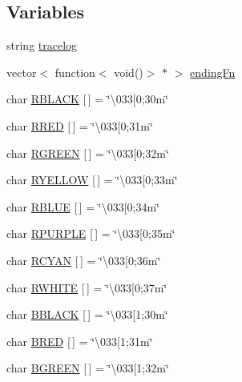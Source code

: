 \subsection*{Variables}
\begin{DoxyCompactItemize}
\item 
string \hyperlink{namespace_k_a8cf9916382d8c2046656233c4422022d}{tracelog}
\item 
vector$<$ function$<$ void()$>$ $\ast$ $>$ \hyperlink{namespace_k_a1c3ecbe3046298af183be61349de6900}{ending\+Fn}
\item 
char \hyperlink{namespace_k_a1203c8bea34ade1c1d524b0df5bfdf37}{R\+B\+L\+A\+CK} \mbox{[}$\,$\mbox{]} = \char`\"{}\textbackslash{}033\mbox{[}0;30m\char`\"{}
\item 
char \hyperlink{namespace_k_ae976a2e4e900318926db4fa1624bc30a}{R\+R\+ED} \mbox{[}$\,$\mbox{]} = \char`\"{}\textbackslash{}033\mbox{[}0;31m\char`\"{}
\item 
char \hyperlink{namespace_k_a9c4858b8b93beb509648e92071d727ca}{R\+G\+R\+E\+EN} \mbox{[}$\,$\mbox{]} = \char`\"{}\textbackslash{}033\mbox{[}0;32m\char`\"{}
\item 
char \hyperlink{namespace_k_abd378d9900fa5f1effc177ef1a3eaf88}{R\+Y\+E\+L\+L\+OW} \mbox{[}$\,$\mbox{]} = \char`\"{}\textbackslash{}033\mbox{[}0;33m\char`\"{}
\item 
char \hyperlink{namespace_k_a035ca76c4d8abd4253d53e1dfb952368}{R\+B\+L\+UE} \mbox{[}$\,$\mbox{]} = \char`\"{}\textbackslash{}033\mbox{[}0;34m\char`\"{}
\item 
char \hyperlink{namespace_k_a16f016905667739f3d64b6ab7e4d7f95}{R\+P\+U\+R\+P\+LE} \mbox{[}$\,$\mbox{]} = \char`\"{}\textbackslash{}033\mbox{[}0;35m\char`\"{}
\item 
char \hyperlink{namespace_k_a816b9af371d1741fead9f73abb978052}{R\+C\+Y\+AN} \mbox{[}$\,$\mbox{]} = \char`\"{}\textbackslash{}033\mbox{[}0;36m\char`\"{}
\item 
char \hyperlink{namespace_k_a37a06065638319240adf83b5bdfdf313}{R\+W\+H\+I\+TE} \mbox{[}$\,$\mbox{]} = \char`\"{}\textbackslash{}033\mbox{[}0;37m\char`\"{}
\item 
char \hyperlink{namespace_k_a1b5ebfb775cf88920f1beb1b59c80137}{B\+B\+L\+A\+CK} \mbox{[}$\,$\mbox{]} = \char`\"{}\textbackslash{}033\mbox{[}1;30m\char`\"{}
\item 
char \hyperlink{namespace_k_ae09107156acfd00c2e31f049f70b622a}{B\+R\+ED} \mbox{[}$\,$\mbox{]} = \char`\"{}\textbackslash{}033\mbox{[}1;31m\char`\"{}
\item 
char \hyperlink{namespace_k_aa83d8d71c463813bdbd57fab20312b7d}{B\+G\+R\+E\+EN} \mbox{[}$\,$\mbox{]} = \char`\"{}\textbackslash{}033\mbox{[}1;32m\char`\"{}

\end{DoxyCompactItemize}
